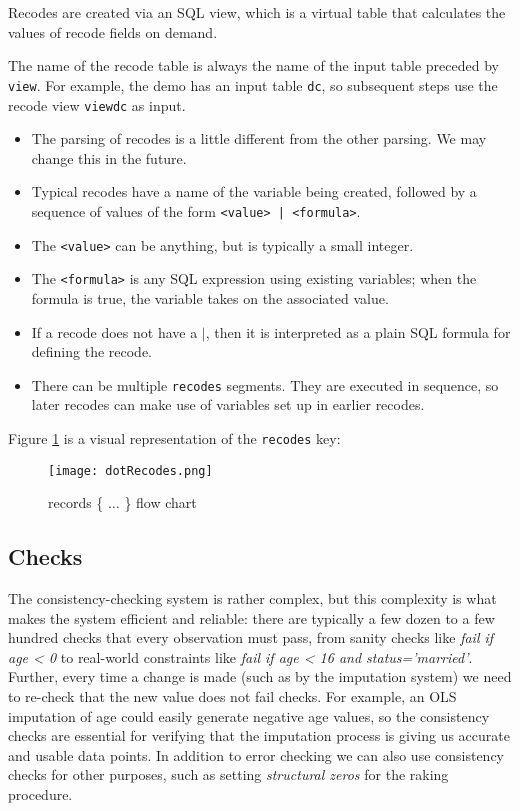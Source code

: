 \documentclass{article}
\begin{document}
Recodes are created via an SQL view, which is a virtual table that calculates the
values of recode fields on demand.

The name of the recode table is always the name of the input table preceded by {\tt
view}.  For example, the demo has an input table {\tt dc}, so subsequent steps use
the recode view {\tt viewdc} as input.

\begin{itemize}
\item The parsing of recodes is a little different from the other parsing. We may change
this in the future. 
\item Typical recodes have a name of the variable being created, followed by a sequence of
values of the form {\tt <value> | <formula>}.
\item The {\tt <value>} can be anything, but is typically a small integer.
\item The {\tt <formula>} is any SQL expression using existing variables; when the formula
is true, the variable takes on the associated value.
\item If a recode does not have a $|$, then it is interpreted as a plain SQL formula for
defining the recode.
\item There can be multiple {\tt recodes} segments. They are executed in sequence, so
later recodes can make use of variables set up in earlier recodes.

\end{itemize}

Figure \ref{recodefigure} is a visual representation of the {\tt recodes} key:

\begin{figure}
\begin{center}
\texttt{[image: dotRecodes.png]}
\caption{records \{ $\ldots$ \} flow chart}\label{recodefigure}
\end{center}
\end{figure}

\subsection{Checks}
The consistency-checking system is rather complex, but this complexity is what makes
the system efficient and reliable: there are typically a few dozen to a few hundred
checks that every observation must pass, from sanity checks like {\em fail if age < 0}
to real-world constraints like {\em fail if age < 16 and status='married'}. Further,
every time a change is made (such as by the imputation system) we need to re-check that
the new value does not fail checks. For example, an OLS imputation of age could easily
generate negative age values, so the consistency checks are essential for verifying that
the imputation process is giving us accurate and usable data points. In addition to
error checking we can also use consistency checks for other purposes, such as setting
{\em structural zeros} for the raking procedure.
\end{document}
